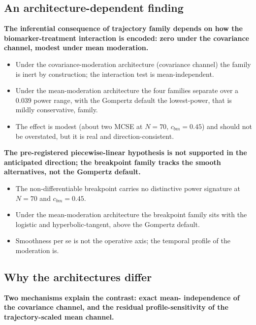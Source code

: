 \documentclass[
  11pt,
]{article}
\begin{document}
\subsection{An architecture-dependent finding}\label{an-architecture-dependent-finding}

\textbf{The inferential consequence of trajectory family depends
on how the biomarker-treatment interaction is encoded: zero
under the covariance channel, modest under mean moderation.}

\begin{itemize}\setlength{\itemsep}{2pt}\setlength{\parskip}{0pt}
\item Under the covariance-moderation architecture (covariance channel) the family is
  inert by construction; the interaction test is mean-independent.
\item Under the mean-moderation architecture the four families
  separate over a 0.039 power range, with the Gompertz default
  the lowest-power, that is mildly conservative, family.
\item The effect is modest (about two MCSE at $N = 70$,
  $c_{bm} = 0.45$) and should not be overstated, but it is real
  and direction-consistent.
\end{itemize}

\textbf{The pre-registered piecewise-linear hypothesis is not
supported in the anticipated direction; the breakpoint family
tracks the smooth alternatives, not the Gompertz default.}

\begin{itemize}\setlength{\itemsep}{2pt}\setlength{\parskip}{0pt}
\item The non-differentiable breakpoint carries no distinctive
  power signature at $N = 70$ and $c_{bm} = 0.45$.
\item Under the mean-moderation architecture the breakpoint family sits with the
  logistic and hyperbolic-tangent, above the Gompertz default.
\item Smoothness per se is not the operative axis; the temporal
  profile of the moderation is.
\end{itemize}

\subsection{Why the architectures differ}\label{why-the-architectures-differ}

\textbf{Two mechanisms explain the contrast: exact mean-
independence of the covariance channel, and the residual
profile-sensitivity of the trajectory-scaled mean channel.}
\end{document}

